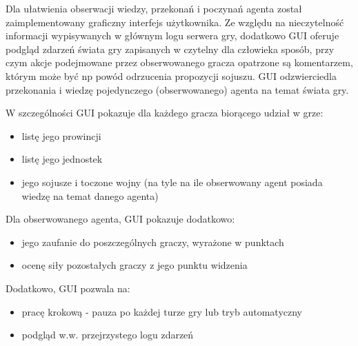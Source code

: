 Dla ułatwienia obserwacji wiedzy, przekonań i poczynań agenta został zaimplementowany graficzny interfejs użytkownika. Ze względu na nieczytelność informacji wypisywanych w głównym logu serwera gry, dodatkowo GUI oferuje podgląd zdarzeń świata gry zapisanych w czytelny dla człowieka sposób, przy czym akcje podejmowane przez obserwowanego gracza opatrzone są komentarzem, którym może być np powód odrzucenia propozycji sojuszu. GUI odzwierciedla przekonania i wiedzę pojedynczego (obserwowanego) agenta na temat świata gry.

W szczególności GUI pokazuje dla każdego gracza biorącego udział w grze:
\begin{itemize}
	\item{listę jego prowincji}
	\item{listę jego jednostek}
	\item{jego sojusze i toczone wojny (na tyle na ile obserwowany agent posiada wiedzę na temat danego agenta)}
\end{itemize}

Dla obserwowanego agenta, GUI pokazuje dodatkowo:
\begin{itemize}
	\item{jego zaufanie do poszczególnych graczy, wyrażone w punktach}
	\item{ocenę siły pozostałych graczy z jego punktu widzenia}
\end{itemize}

Dodatkowo, GUI pozwala na:
\begin{itemize}
	\item{pracę krokową - pauza po każdej turze gry lub tryb automatyczny}
	\item{podgląd w.w. przejrzystego logu zdarzeń}
\end{itemize}
